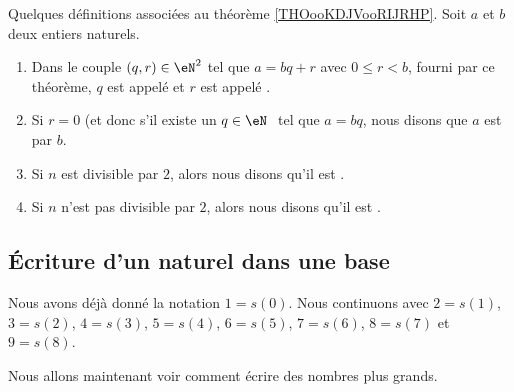 \begin{definition}	\label{DEFooDivisibleNombrePairImpair}
	Quelques définitions associées au théorème \ref{THOooKDJVooRIJRHP}. Soit \( a \) et \( b \) deux entiers naturels.
	\begin{enumerate}
		\item
		      Dans le couple \( (q,r)\in \eN^2\) tel que \( a=bq+r\) avec \( 0\leq r<b\), fourni par ce théorème, \( q \) est appelé  et \( r \) est appelé .
		\item
		      Si \( r=0\) (et donc s'il existe un \( q \in \eN \) tel que \( a = bq \), nous disons que \( a\) est  par \( b\).
		\item
		      Si \( n\) est divisible par \( 2\), alors nous disons qu'il est .
		\item\label{ITEMooDLHHooTmWSnN}
		      Si \( n\) n'est pas divisible par \( 2\), alors nous disons qu'il est .
	\end{enumerate}
\end{definition}

\subsection{Écriture d'un naturel dans une base}
\label{SUBooEcritureNaturels}

\begin{normaltext}	\label{NORooEcritureChiffres}
	Nous avons déjà donné la notation \( 1=s(0)\). Nous continuons avec \( 2=s(1)\), \( 3=s(2)\), \( 4=s(3)\), \( 5=s(4)\), \( 6=s(5)\), \( 7=s(6)\), \( 8=s(7)\) et \( 9=s(8)\).

	Nous allons maintenant voir comment écrire des nombres plus grands.
\end{normaltext}

